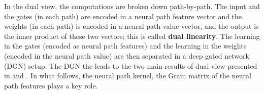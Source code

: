In the dual view, the computations are broken down path-by-path. The input and the gates (in each path) are encoded in a neural path feature vector and the weights (in each path) is encoded in a neural path value vector, and the output is the inner product of these two vectors; this is called \textbf{dual linearity}.  The learning in the gates (encoded as neural path features) and the learning in the weights (encoded in the neural path value) are then separated in a deep gated network (DGN) setup. The DGN the leads to the two main results of dual view presented in  and . In what follows, the neural path kernel, the Gram matrix of the neural path features plays a key role. %

